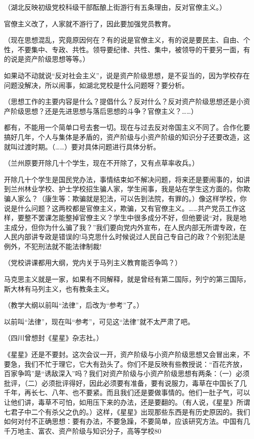 （湖北反映初级党校科级干部酝酿上街游行有五条理由，反对官僚主义。）

官僚主义改了，人家就不游行了，因此要加强党员教育。

（现在思想混乱，究竟原因何在？有的说是官僚主义，有的说是要民主、自由、个性，不要集中、专政、共性。领导要纪律、共性、集中，被领导的干要另一面，有的说是资产阶级思想等等。）

如果动不动就说“反对社会主义”，说是资产阶级思想，是不妥当的，因为学校存在问题没解决，所以闹事，如湖北党校是什么问题呀？要分析。

（思想工作的主要内容是什么？提倡什么？反对什么？反对资产阶级思想还是小资产阶级思想？还是先进思想与落后思想的斗争？官僚主义？……）

都有，不能用一个简单口号去套一切。现在与过去反对帝国主义不同了。合作化要搞好几年，个人与集体是矛盾的，资产阶级与小资产阶级的知识分子还要改造，这就叫过渡时期。（……）要对具体问题进行具体分析。

（兰州原要开除几十个学生，现在不开除了，又有点草率收兵。）

开除几十个学生是国民党办法，事情结束如不解决问题，将来还是要闹事的，如讲到兰州林业学校、护士学校招生骗人家，学生闹事，我是站在学生这方面的。你欺骗人家么？（康生等：欺骗就是犯法，可以告到法院，有罪的。）像这样学校，你说是什么问题？这两校都是官僚主义，欺骗，又有官僚主义。……共产党员工作这样，要整不罢课怎能整掉官僚主义？学生中很多成分不好，但他要说“对，我是地主成分，但你为什么骗了我？”我们要向党内外宣布，在人民内部无所谓专政，在人民内部讲专政是错误的!马克思什么时候说过人民自己专自己的政？个别犯法是例外，不犯刑法就不能法律制裁!

（党校讲课都用大纲，党内关于马列主义教育能否争鸣？）

马克思主义就是一家，如果有不同解释，就是曾经有第二国际，列宁的第三国际，斯大林有马列主义，也有教条主义。

（教学大纲以前叫“法律”，后改为“参考”了。）

以前叫“法律”，现在叫“参考”，可见这“法律”就不太严肃了吧。

（四川曾想封《星星》杂志社。）

《星星》还是不要封。这次会议一开，资产阶级与小资产阶级思想又会冒出来，不要急，我们不忙于理它，它大有劲头了。你们不是反映有些教授说：“百花齐放，百家争鸣”是“诱敌深入”吗？我们对资产阶级与小资产阶级思想有两条：（一）必须批评，（二）必须批评得好，因此必须要有准备，要有说服力，毒草在中国长了几千年，再长七、八年、也不要紧。而且我们还是要做事情的。他们一肚子气，可以让他们讲，毒草不可怕，如用压下来的办法，还是要翻的。（有人说，《星星》所谓七君子中二个有杀父之仇的。）这样，《星星》出现那些东西是有历史原因的。我们如何对付不正确思想：要有办法，不要急躁，不要简单，应该研究方法。中国有几千万地主、富农、资产阶级与知识分子，高等学校80%

